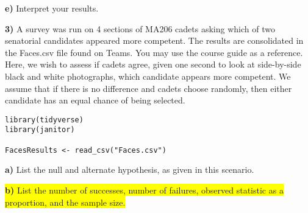 \documentclass{article}
\newif\ifPrintSolution
\newcommand{\sol}[1]{\ifPrintSolution {\color{blue} #1 } \fi}
\begin{document}
\vspace{0.25in}

\hspace{0.1in} \textbf{e) } Interpret your results.

\sol{With a p-value of 0.0000000000003747 and a standardized statistic of 7.17, we have \textbf{very strong} evidence against the null hypothesis that cadets have no preference between the homemade, Chips Ahoy, and Keebler makers of chocolate chip cookies.}

\pagebreak




\textbf{3) } A survey was run on 4 sections of MA206 cadets asking which of two senatorial candidates appeared more competent. The results are consolidated in the \color{blue} Faces.csv \color{black} file found on Teams. You may use the course guide as a reference. Here, we wish to assess if cadets agree, given one second to look at side-by-side black and white photographs, which candidate appears more competent. We assume that if there is no difference and cadets choose randomly, then either candidate has an equal chance of being selected.

\color{blue}
\begin{verbatim}
library(tidyverse)
library(janitor)

FacesResults <- read_csv("Faces.csv")
\end{verbatim}
\color{black}

\hspace{0.1in} \textbf{a) } List the null and alternate hypothesis, as given in this scenario.

\sol{$H_0: \pi = \frac{1}{2}$. The true long-run proportion of cadets who choose the candidate on the left (or right) is equal to $\frac{1}{2}$\\
$H_a: \pi \ne \frac{1}{2}$. The true long-run proportion of cadets who choose the candidate on the left (or right) is not equal to $\frac{1}{2}$}

\vspace{0.25in}

\hspace{0.1in} \colorbox{yellow}{\textbf{b) } List the number of successes, number of failures, observed statistic as a proportion, and the sample size.}

\sol{Here, we are defining the candidate on the left as a "success." \\
Number of ``successes" = 59\\
Number of ``failures" = 4 \\
$\hat{p} = \frac{59}{63} = 0.9365$\\
\textit{n} = 63}
\end{document}
